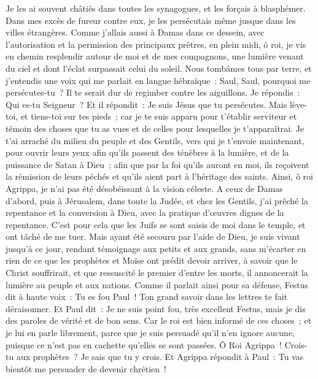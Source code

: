\begin{multicols}{2}
Je les ai souvent châtiés dans toutes les synagogues, et les forçais à blasphémer. Dans mes excès de fureur contre eux, je les persécutais même jusque dans les villes étrangères.
Comme j'allais aussi à Damas dans ce dessein, avec l'autorisation et la permission des principaux prêtres,
en plein midi, ô roi, je vis en chemin resplendir autour de moi et de mes compagnons, une lumière venant du ciel et dont l'éclat surpassait celui du soleil.
Nous tombâmes tous par terre, et j'entendis une voix qui me parlait en langue hébraïque~: Saul, Saul, pourquoi me persécutes-tu~? Il te serait dur de regimber contre les aiguillons.
Je répondis~: Qui es-tu Seigneur~? Et il répondit~: Je suis Jésus que tu persécutes.
Mais lève-toi, et tiens-toi sur tes pieds~; car je te suis apparu pour t'établir serviteur et témoin des choses que tu as vues et de celles pour lesquelles je t'apparaîtrai.
Je t'ai arraché du milieu du peuple et des Gentils, vers qui je t'envoie maintenant,
pour ouvrir leurs yeux afin qu'ils passent des ténèbres à la lumière, et de la puissance de Satan à Dieu~; afin que par la foi qu'ils auront en moi, ils reçoivent la rémission de leurs péchés et qu'ils aient part à l'héritage des saints.
Ainsi, ô roi Agrippa, je n'ai pas été désobéissant à la vision céleste.
A ceux de Damas d'abord, puis à Jérusalem, dans toute la Judée, et chez les Gentils, j'ai prêché la repentance et la conversion à Dieu, avec la pratique d'œuvres dignes de la repentance.
C'est pour cela que les Juifs se sont saisis de moi dans le temple, et ont tâché de me tuer.
Mais ayant été secouru par l'aide de Dieu, je suis vivant jusqu'à ce jour, rendant témoignage aux petits et aux grands, sans m'écarter en rien de ce que les prophètes et Moïse ont prédit devoir arriver,
à savoir que le Christ souffrirait, et que ressuscité le premier d'entre les morts, il annoncerait la lumière au peuple et aux nations.
Comme il parlait ainsi pour sa défense, Festus dit à haute voix~: Tu es fou Paul~! Ton grand savoir dans les lettres te fait déraisonner.
Et Paul dit~: Je ne suis point fou, très excellent Festus, mais je dis des paroles de vérité et de bon sens.
Car le roi est bien informé de ces choses~; et je lui en parle librement, parce que je suis persuadé qu'il n'en ignore aucune, puisque ce n'est pas en cachette qu'elles se sont passées.
Ô Roi Agrippa~! Crois-tu aux prophètes~? Je sais que tu y crois.
Et Agrippa répondit à Paul~: Tu vas bientôt me persuader de devenir chrétien~!

\end{multicols}
